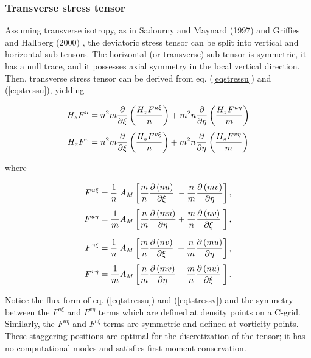 \subsubsection{Transverse stress tensor}

Assuming transverse isotropy, as in Sadourny and Maynard (1997)
\cite{Sadourny_97} and Griffies and Hallberg (2000) \cite{Griffies_2000},
the deviatoric stress tensor can be split into vertical and horizontal
sub-tensors.  The horizontal (or transverse) sub-tensor is symmetric, it
has a null trace, and it possesses axial symmetry in the local vertical
direction.  Then, transverse stress tensor can be derived from eq.
(\ref{eqstressu}) and (\ref{eqstressu}), yielding

\begin{align}
      H_{z}F^{u} &= {n^2}m
{\partial\over\partial\xi}\left(\frac{H_{z}F^{u\xi}}{n}\right) +
                {m^2}n
{\partial\over\partial\eta}\left(\frac{H_{z}F^{u\eta}}{m}\right)
\label{eqtstressu} \\
   \noalign{\smallskip}
      H_{z}F^{v} &= {n^2}m
{\partial\over\partial\xi}\left(\frac{H_{z}F^{v\xi}}{n}\right) +
                {m^2}n
{\partial\over\partial\eta}\left(\frac{H_{z}F^{v\eta}}{m}\right)
\label{eqtstressv} 
\end{align}

where

\begin{align}
         F^{u\xi} &= \frac{1}{n} \;A_{M}\left[
               \frac{m}{n} {\pder{\left( nu \right) }{\xi}} \;-
               \frac{n}{m} {\pder{\left( mv \right) }{\eta}}
\right], \\
      \noalign{\smallskip}
         F^{u\eta} &= \frac{1}{m} A_{M}\left[
               \frac{n}{m} {\pder{\left( mu \right) }{\eta}} +
               \frac{m}{n} {\pder{\left( nv \right) }{\xi}}
\;\right], \\
      \noalign{\medskip}
         F^{v\xi} &= \frac{1}{n} \;A_{M}\left[
               \frac{m}{n} {\pder{\left( nv \right) }{\xi}} \;+
               \frac{n}{m} {\pder{\left( mu \right) }{\eta}}
\right], \\
      \noalign{\smallskip}
         F^{v\eta} &= \frac{1}{m} A_{M}\left[
               \frac{n}{m} {\pder{\left( mv \right) }{\eta}} -
               \frac{m}{n} {\pder{\left( nu \right) }{\xi}}
\;\right].
\end{align}

Notice the flux form of eq. (\ref{eqtstressu}) and (\ref{eqtstressv})
and the symmetry between the $F^{u\xi}$ and $F^{v\eta}$ terms which are
defined at density points on a C-grid. Similarly, the $F^{u\eta}$ and
$F^{v\xi}$ terms are symmetric and defined at vorticity points.  These
staggering positions are optimal for the discretization of the tensor;
it has no computational modes and satisfies first-moment conservation.

